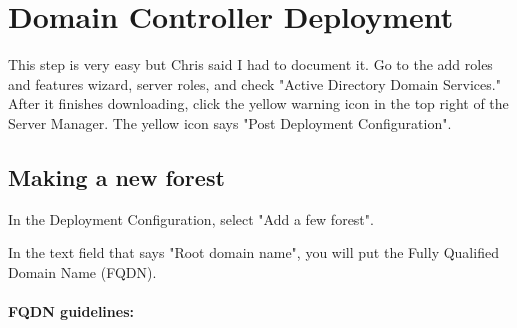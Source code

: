 \documentclass{article}
\begin{document}
\section{Domain Controller Deployment}
This step is very easy but Chris said I had to document it. 
Go to the add roles and features wizard, server roles, and check
"Active Directory Domain Services." After it finishes downloading,
click the yellow warning icon in the top right of the Server Manager.
The yellow icon says "Post Deployment Configuration".

\subsection{Making a new forest}
In the Deployment Configuration, select "Add a few forest".

In the text field that says "Root domain name", you will put the Fully
Qualified Domain Name (FQDN).

\paragraph{FQDN guidelines:}
\end{document}
